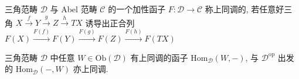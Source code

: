 \begin{definition}
    三角范畴 \(\mathcal{D}\) 与 Abel 范畴 \(\mathcal{C}\) 的一个加性函子 \(F : \mathcal{D} \to \mathcal{C}\) 称上同调的, 若任意好三角 \(X \xrightarrow{f} Y \xrightarrow{g} Z \xrightarrow{h} T X\) 诱导出正合列
    \(F (X) \xrightarrow{F (f)} F (Y) \xrightarrow{F (g)} F (Z) \xrightarrow{F (h)} F (T X)\)
\end{definition}

\begin{lemma}
    三角范畴 \(\mathcal{D}\) 中任意 \(W \in \mathrm{Ob} (\mathcal{D})\) 有上同调的函子 \(\mathrm{Hom}_{\mathcal{D}} (W,-)\),
    与 \(\mathcal{D}^{\mathrm{op}}\) 出发的 \(\mathrm{Hom}_{\mathcal{D}} (-,W)\) 亦上同调.
\end{lemma}
